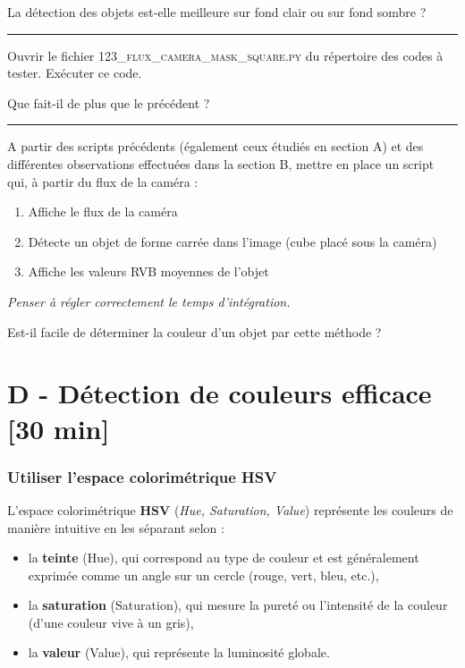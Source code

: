 \documentclass[a4paper,12pt,titlepage]{article} %
\begin{document}
\Quest La détection des objets est-elle meilleure sur fond clair ou sur fond sombre ?


\noindent \rule{\linewidth}{1pt}

\Manip Ouvrir le fichier \textsc{123\_flux\_camera\_mask\_square.py} du répertoire des codes à tester. Exécuter ce code.

\Quest Que fait-il de plus que le précédent ?

\noindent \rule{\linewidth}{1pt}

\Manip A partir des scripts précédents (également ceux étudiés en section A) et des différentes observations effectuées dans la section B, mettre en place un script qui, à partir du flux de la caméra :

\begin{enumerate}
	\item Affiche le flux de la caméra 
	\item Détecte un objet de forme carrée dans l'image (cube placé sous la caméra)
	\item Affiche les valeurs RVB moyennes de l'objet
\end{enumerate}

\bigskip

\textit{Penser à régler correctement le temps d'intégration.}

\medskip

\Quest Est-il facile de déterminer la couleur d'un objet par cette méthode ?


\newpage
\section{D - Détection de couleurs efficace {[30 min]}}

\subsubsection{Utiliser l'espace colorimétrique HSV}

L'espace colorimétrique \textbf{HSV} (\textit{Hue, Saturation, Value}) représente les couleurs de manière intuitive en les séparant selon :

\begin{itemize}
	\item la \textbf{teinte} (Hue), qui correspond au type de couleur et est généralement exprimée comme un angle sur un cercle (rouge, vert, bleu, etc.), 
	\item la \textbf{saturation} (Saturation), qui mesure la pureté ou l'intensité de la couleur (d'une couleur vive à un gris),
	\item la \textbf{valeur} (Value), qui représente la luminosité globale.
\end{itemize} 
\end{document}
